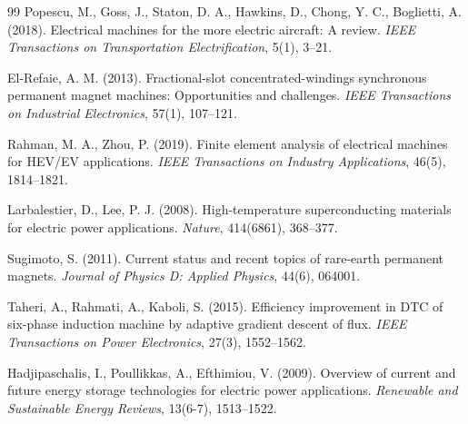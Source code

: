 \documentclass[12pt,a4paper]{article}
\begin{document}
\begin{thebibliography}{99}
Popescu, M., Goss, J., Staton, D. A., Hawkins, D., Chong, Y. C., Boglietti, A. (2018). Electrical machines for the more electric aircraft: A review. \textit{IEEE Transactions on Transportation Electrification}, 5(1), 3--21.

El-Refaie, A. M. (2013). Fractional-slot concentrated-windings synchronous permanent magnet machines: Opportunities and challenges. \textit{IEEE Transactions on Industrial Electronics}, 57(1), 107--121.

Rahman, M. A., Zhou, P. (2019). Finite element analysis of electrical machines for HEV/EV applications. \textit{IEEE Transactions on Industry Applications}, 46(5), 1814--1821.

Larbalestier, D., Lee, P. J. (2008). High-temperature superconducting materials for electric power applications. \textit{Nature}, 414(6861), 368--377.

Sugimoto, S. (2011). Current status and recent topics of rare-earth permanent magnets. \textit{Journal of Physics D: Applied Physics}, 44(6), 064001.

Taheri, A., Rahmati, A., Kaboli, S. (2015). Efficiency improvement in DTC of six-phase induction machine by adaptive gradient descent of flux. \textit{IEEE Transactions on Power Electronics}, 27(3), 1552--1562.

Hadjipaschalis, I., Poullikkas, A., Efthimiou, V. (2009). Overview of current and future energy storage technologies for electric power applications. \textit{Renewable and Sustainable Energy Reviews}, 13(6-7), 1513--1522.

\end{thebibliography}
\end{document}
